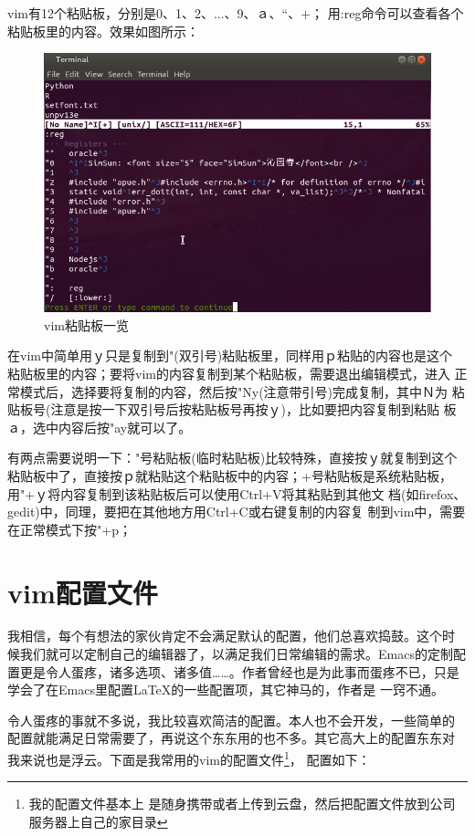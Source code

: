 vim有12个粘贴板，分别是0、1、2、...、9、ａ、“、+；
用:reg命令可以查看各个粘贴板里的内容。效果如图所示：

\begin{figure}[htbp]
  \begin{center}
    \includegraphics[width=.75\textwidth]{img/vimregister.png}
  \end{center}
  \caption{vim粘贴板一览}
  \label{fig:vimClipBoard}
\end{figure}

在vim中简单用ｙ只是复制到"(双引号)粘贴板里，同样用ｐ粘贴的内容也是这个
粘贴板里的内容；要将vim的内容复制到某个粘贴板，需要退出编辑模式，进入
正常模式后，选择要将复制的内容，然后按"Ny(注意带引号)完成复制，其中Ｎ为
粘贴板号(注意是按一下双引号后按粘贴板号再按ｙ)，比如要把内容复制到粘贴
板ａ，选中内容后按"ay就可以了。

有两点需要说明一下："号粘贴板(临时粘贴板)比较特殊，直接按ｙ就复制到这个
粘贴板中了，直接按ｐ就粘贴这个粘贴板中的内容；+号粘贴板是系统粘贴板，
用"+ｙ将内容复制到该粘贴板后可以使用Ctrl+V将其粘贴到其他文
档(如firefox、gedit)中，同理，要把在其他地方用Ctrl+C或右键复制的内容复
制到vim中，需要在正常模式下按"+p；

\section{vim配置文件}

我相信，每个有想法的家伙肯定不会满足默认的配置，他们总喜欢捣鼓。这个时
候我们就可以定制自己的编辑器了，以满足我们日常编辑的需求。Emacs的定制配
置更是令人蛋疼，诸多选项、诸多值……。作者曾经也是为此事而蛋疼不已，只是
学会了在Emacs里配置\LaTeX\index{\LaTeX}的一些配置项，其它神马的，作者是
一窍不通。

令人蛋疼的事就不多说，我比较喜欢简洁的配置。本人也不会开发，一些简单的
配置就能满足日常需要了，再说这个东东用的也不多。其它高大上的配置东东对
我来说也是浮云。下面是我常用的vim的配置文件\footnote{我的配置文件基本上
  是随身携带或者上传到云盘，然后把配置文件放到公司服务器上自己的家目录}，
配置如下：

